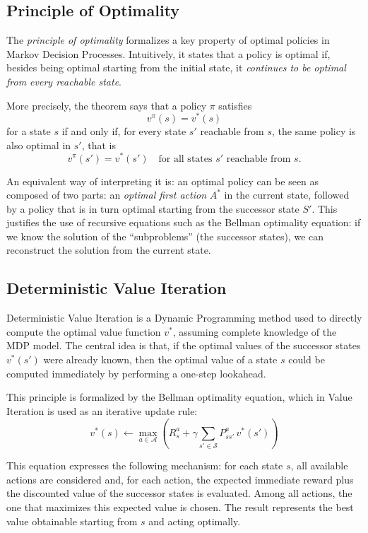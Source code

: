 \subsection{Principle of Optimality}

The \emph{principle of optimality} formalizes a key property of optimal policies in Markov Decision Processes. Intuitively, it states that a policy is optimal if, besides being optimal starting from the initial state, it \emph{continues to be optimal from every reachable state}.

More precisely, the theorem says that a policy $\pi$ satisfies
\[
v^\pi(s) = v^*(s)
\]
for a state $s$ if and only if, for every state $s'$ reachable from $s$, the same policy is also optimal in $s'$, that is
\[
v^\pi(s') = v^*(s') \quad \text{for all states } s' \text{ reachable from } s.
\]

An equivalent way of interpreting it is: an optimal policy can be seen as composed of two parts: an \emph{optimal first action} $A^*$ in the current state, followed by a policy that is in turn optimal starting from the successor state $S'$. This justifies the use of recursive equations such as the Bellman optimality equation: if we know the solution of the “subproblems” (the successor states), we can reconstruct the solution from the current state.


\subsection{Deterministic Value Iteration}

Deterministic Value Iteration is a Dynamic Programming method used to directly compute the optimal value function $v^*$, assuming complete knowledge of the MDP model. The central idea is that, if the optimal values of the successor states $v^*(s')$ were already known, then the optimal value of a state $s$ could be computed immediately by performing a one-step lookahead.

This principle is formalized by the Bellman optimality equation, which in Value Iteration is used as an iterative update rule:
\[
v^*(s) \leftarrow \max_{a \in \mathcal{A}} \left( R_s^a + \gamma \sum_{s' \in \mathcal{S}} P_{ss'}^a \, v^*(s') \right)
\]

This equation expresses the following mechanism: for each state $s$, all available actions are considered and, for each action, the expected immediate reward plus the discounted value of the successor states is evaluated. Among all actions, the one that maximizes this expected value is chosen. The result represents the best value obtainable starting from $s$ and acting optimally.

